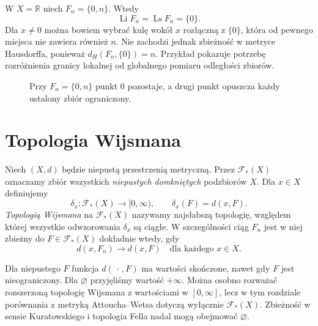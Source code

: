 \begin{przyklad}
\label{ex:topog22-escape}
W \(X=\mathbb R\) niech
\(F_n=\{0,n\}\).
Wtedy
\[
 \operatorname{Li}F_n=\operatorname{Ls}F_n=\{0\}.
\]
Dla \(x\neq0\) można bowiem wybrać kulę wokół \(x\)
rozłączną z \(\{0\}\), która od pewnego miejsca
nie zawiera również \(n\).
Nie zachodzi jednak zbieżność w metryce Hausdorffa,
ponieważ \(d_H(F_n,\{0\})=n\).
Przykład pokazuje potrzebę rozróżnienia
granicy lokalnej od globalnego pomiaru odległości zbiorów.

\begin{figure}[htbp]
\centering
{}
\caption{Przy \(F_n=\{0,n\}\) punkt \(0\) pozostaje,
a drugi punkt opuszcza każdy ustalony zbiór ograniczony.}
\label{fig:topog22-escape}
\end{figure}
\end{przyklad}

\section{Topologia Wijsmana}
\label{sec:topog22-wijsman}

\begin{definicja}
\label{def:topog22-wijsman}
Niech \((X,d)\) będzie niepustą przestrzenią metryczną.
Przez \(\mathcal F_*(X)\) oznaczamy zbiór wszystkich
\emph{niepustych domkniętych} podzbiorów \(X\).
Dla \(x\in X\) definiujemy
\[
 \delta_x\colon\mathcal F_*(X)\to[0,\infty),
 \qquad \delta_x(F)=d(x,F).
\]
\emph{Topologią Wijsmana} na \(\mathcal F_*(X)\)
nazywamy najsłabszą topologię, względem której
wszystkie odwzorowania \(\delta_x\) są ciągłe.
W szczególności ciąg \(F_n\) jest w niej zbieżny
do \(F\in\mathcal F_*(X)\) dokładnie wtedy, gdy
\[
 d(x,F_n)\longrightarrow d(x,F)
 \quad\text{dla każdego }x\in X.
\]
\end{definicja}

\begin{uwaga}
\label{rem:topog22-wijsman-empty}
Dla niepustego \(F\) funkcja \(d(\,\cdot\,,F)\)
ma wartości skończone, nawet gdy \(F\) jest nieograniczony.
Dla \(\varnothing\) przyjęliśmy wartość \(+\infty\).
Można osobno rozważać rozszerzoną topologię Wijsmana
z wartościami w \([0,\infty]\), lecz w tym rozdziale
porównania z metryką Attoucha--Wetsa dotyczą
wyłącznie \(\mathcal F_*(X)\).
Zbieżność w sensie Kuratowskiego i topologia Fella
nadal mogą obejmować \(\varnothing\).
\end{uwaga}

